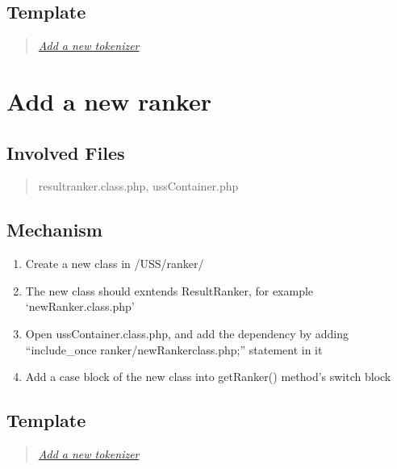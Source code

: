\documentclass[letterpaper,10pt,english]{sphinxmanual}
\begin{document}
\subsection{Template}
\label{docs/hooks/new_selector:template}\begin{quote}

{\hyperref[docs/hooks/t_tokenizer:hook-template-uss]{\emph{Add a new tokenizer}}}
\end{quote}


\section{Add a new ranker}
\label{docs/hooks/new_ranker:add-a-new-ranker}\label{docs/hooks/new_ranker::doc}\label{docs/hooks/new_ranker:hook-ranker}

\subsection{Involved Files}
\label{docs/hooks/new_ranker:involved-files}\begin{quote}

resultranker.class.php, ussContainer.php
\end{quote}


\subsection{Mechanism}
\label{docs/hooks/new_ranker:mechanism}\begin{enumerate}
\item {} 
Create a new class in /USS/ranker/

\item {} 
The new class should exntends ResultRanker, for example `newRanker.class.php'

\item {} 
Open ussContainer.class.php, and add the dependency by adding ``include\_once ranker/newRankerclass.php;'' statement in it

\item {} 
Add a case block of the new class into getRanker() method's switch block

\end{enumerate}


\subsection{Template}
\label{docs/hooks/new_ranker:template}\begin{quote}

{\hyperref[docs/hooks/t_tokenizer:hook-template-uss]{\emph{Add a new tokenizer}}}
\end{quote}
\end{document}

